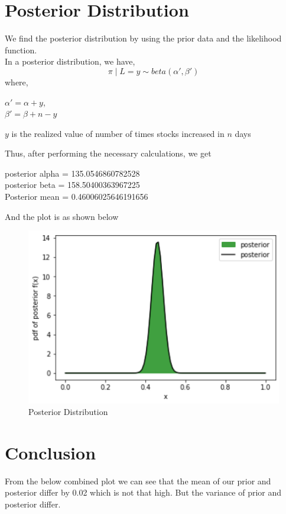 \documentclass[journal,12pt,twocolumn]{IEEEtran}
\begin{document}
\section{Posterior Distribution}
We find the posterior distribution by using the prior data and the likelihood function. \\
In a posterior distribution, we have,
\begin{equation}
\pi \mid L = y \sim beta(\alpha', \beta')
\end{equation}
where, 
\begin{center}
$\alpha' = \alpha + y$, \\
$\beta' =  \beta + n - y$ \\ 
\end{center}
 
$y$ is the realized value of number of times stocks increased in $n$ days


Thus, after performing the necessary calculations, we get 
\begin{center}
posterior alpha = 135.0546860782528\\
posterior beta = 158.50400363967225\\
Posterior mean = 0.46006025646191656\\    
\end{center}

And the plot is as shown below
\begin{figure}[!ht]
\centering
\includegraphics[width=\columnwidth]{Images/Posterior_Dist.png}
\caption{Posterior Distribution}
\label{fig:yndft}
\end{figure}
\section{Conclusion}
From the below combined plot we can see that the mean of our prior and posterior differ by 0.02 which is not that high. But the variance of prior and posterior differ.
\end{document}
